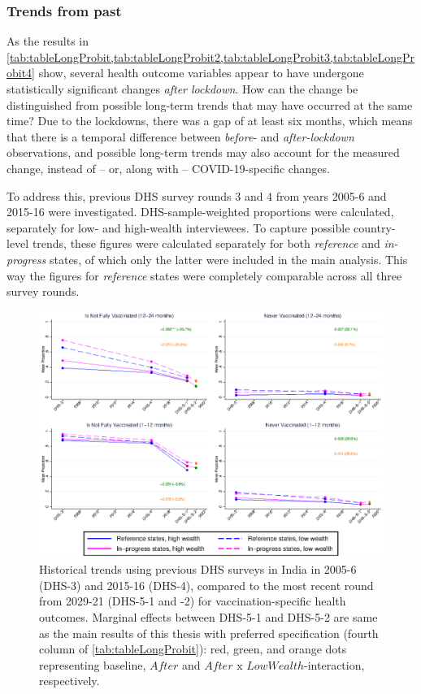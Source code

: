 \documentclass[12pt,a4paper,notitlepage]{article}
\begin{document}
\subsubsection{Trends from past} \label{subsubsec:trends}

As the results in \cref{tab:tableLongProbit,tab:tableLongProbit2,tab:tableLongProbit3,tab:tableLongProbit4} show, several health outcome variables appear to have undergone statistically significant changes \textit{after lockdown}. How can the change be distinguished from possible long-term trends that may have occurred at the same time? Due to the lockdowns, there was a gap of at least six months, which means that there is a temporal difference between \textit{before}- and \textit{after-lockdown} observations, and possible long-term trends may also account for the measured change, instead of -- or, along with -- COVID-19-specific changes.

To address this, previous DHS survey rounds 3 and 4 from years 2005-6 and 2015-16 were investigated. DHS-sample-weighted proportions were calculated, separately for low- and high-wealth interviewees. To capture possible country-level trends, these figures were calculated separately for both \textit{reference} and \textit{in-progress} states, of which only the latter were included in the main analysis. This way the figures for \textit{reference} states were completely comparable across all three survey rounds.

\begin{figure}
\includegraphics[width=1\linewidth]{images/meanGraphs1.eps}
\caption{\label{fig:meanGraphs1} Historical trends using previous DHS surveys in India in 2005-6 (DHS-3) and 2015-16 (DHS-4), compared to the most recent round from 2029-21 (DHS-5-1 and -2) for vaccination-specific health outcomes. Marginal effects between DHS-5-1 and DHS-5-2 are same as the main results of this thesis with preferred specification (fourth column of \cref{tab:tableLongProbit}): red, green, and orange dots representing baseline, $After$ and $After\text{ x }LowWealth$-interaction, respectively.}
\end{figure}
\end{document}
